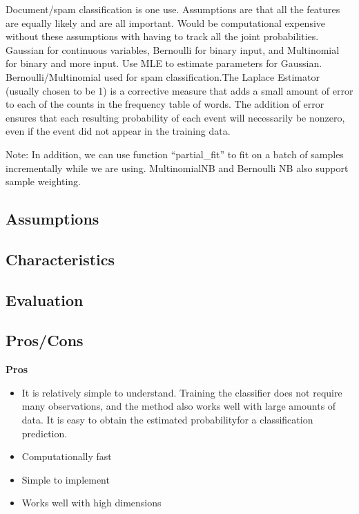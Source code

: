 \documentclass[]{book}
\begin{document}
Document/spam classification is one use. Assumptions are that all the
features are equally likely and are all important. Would be
computational expensive without these assumptions with having to track
all the joint probabilities. Gaussian for continuous variables,
Bernoulli for binary input, and Multinomial for binary and more input.
Use MLE to estimate parameters for Gaussian. Bernoulli/Multinomial used
for spam classification.The Laplace Estimator (usually chosen to be 1)
is a corrective measure that adds a small amount of error to each of the
counts in the frequency table of words. The addition of error ensures
that each resulting probability of each event will necessarily be
nonzero, even if the event did not appear in the training data.

Note: In addition, we can use function ``partial\_fit'' to fit on a
batch of samples incrementally while we are using. MultinomialNB and
Bernoulli NB also support sample weighting.

\subsection{Assumptions}\label{assumptions-10}

\subsection{Characteristics}\label{characteristics-9}

\subsection{Evaluation}\label{evaluation-10}

\subsection{Pros/Cons}\label{proscons-10}

\textbf{Pros}

\begin{itemize}
\item
  It is relatively simple to understand. Training the classifier does
  not require many observations, and the method also works well with
  large amounts of data. It is easy to obtain the estimated
  probabilityfor a classification prediction.
\item
  Computationally fast
\item
  Simple to implement
\item
  Works well with high dimensions
\end{itemize}
\end{document}

